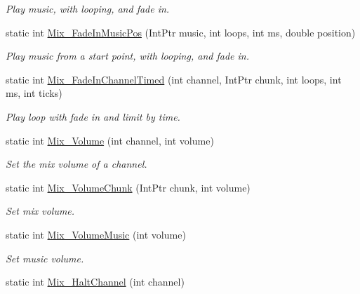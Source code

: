 \begin{DoxyCompactItemize}
\begin{DoxyCompactList}\small\item\em Play music, with looping, and fade in. \item\end{DoxyCompactList}\item 
static int \hyperlink{namespace_tao_1_1_sdl_a45909046f32da6098114b07ce9bc0737}{Mix\_\-FadeInMusicPos} (IntPtr music, int loops, int ms, double position)
\begin{DoxyCompactList}\small\item\em Play music from a start point, with looping, and fade in. \item\end{DoxyCompactList}\item 
static int \hyperlink{namespace_tao_1_1_sdl_a14f4c9f0bd2530ecade88aa16efb5176}{Mix\_\-FadeInChannelTimed} (int channel, IntPtr chunk, int loops, int ms, int ticks)
\begin{DoxyCompactList}\small\item\em Play loop with fade in and limit by time. \item\end{DoxyCompactList}\item 
static int \hyperlink{namespace_tao_1_1_sdl_ae0b5954941c3c2d6deba7d27e0b67f6f}{Mix\_\-Volume} (int channel, int volume)
\begin{DoxyCompactList}\small\item\em Set the mix volume of a channel. \item\end{DoxyCompactList}\item 
static int \hyperlink{namespace_tao_1_1_sdl_a2ae08cb0b9b859fc334245918efd4bf6}{Mix\_\-VolumeChunk} (IntPtr chunk, int volume)
\begin{DoxyCompactList}\small\item\em Set mix volume. \item\end{DoxyCompactList}\item 
static int \hyperlink{namespace_tao_1_1_sdl_a0f37be729516417cc01f98fb63f0b426}{Mix\_\-VolumeMusic} (int volume)
\begin{DoxyCompactList}\small\item\em Set music volume. \item\end{DoxyCompactList}\item 
static int \hyperlink{namespace_tao_1_1_sdl_af54a9841ce1683918d040509fc214d78}{Mix\_\-HaltChannel} (int channel)

\end{DoxyCompactItemize}
